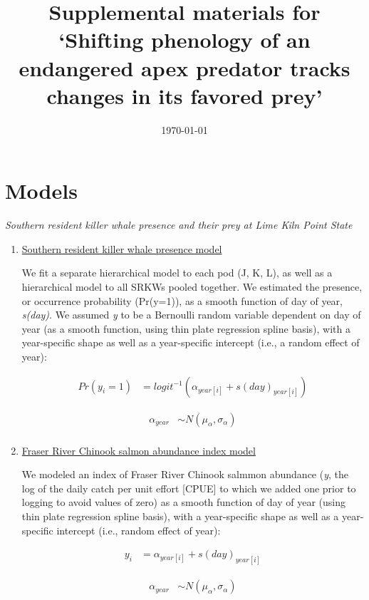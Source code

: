 \documentclass{article}
\begin{document}



\title{Supplemental materials for `Shifting phenology of an endangered apex predator tracks changes in its favored prey'}
\date{\today}
\maketitle
\author{}
\renewcommand{\thetable}{S\arabic{table}}
\renewcommand{\thefigure}{S\arabic{figure}}
\section*{Models}
\emph{Southern resident killer whale presence and their prey at Lime Kiln Point State}
\begin{enumerate}
\item \underline{Southern resident killer whale presence model}
\par We fit a separate hierarchical model to each pod (J, K, L), as well as a hierarchical model to all SRKWs pooled together. We estimated the presence, or occurrence probability (Pr(y=1)), as a smooth function of day of year, \emph{s(day)}. We assumed \emph{y} to be a Bernoulli random variable dependent on day of year (as a smooth function, using thin plate regression spline basis), with a year-specific shape as well as a year-specific intercept (i.e., a random effect of year):


\begin{align*}
Pr(y_i = 1) &= logit^{-1} (\alpha_{year[i]} + s(day)_{year[i]})
\end{align*}

\begin{align*}
\alpha_{year} & \sim N(\mu_{\alpha}, \sigma_{\alpha}) \\
\end{align*}


\item \underline{Fraser River Chinook salmon abundance index model}

We modeled an index of Fraser River Chinook salmmon abundance (\emph{y}, the log of the daily catch per unit effort [CPUE] to which we added one prior to logging to avoid values of zero) as a smooth function of day of year (using thin plate regression spline basis), with a year-specific shape as well as a year-specific intercept (i.e., random effect of year):


\begin{align*}
y_i &= \alpha_{year[i]} + s(day)_{year[i]}
\end{align*}

\begin{align*}
\alpha_{year} & \sim N(\mu_{\alpha}, \sigma_{\alpha}) \\
\end{align*}

\end{enumerate}
\end{document}
